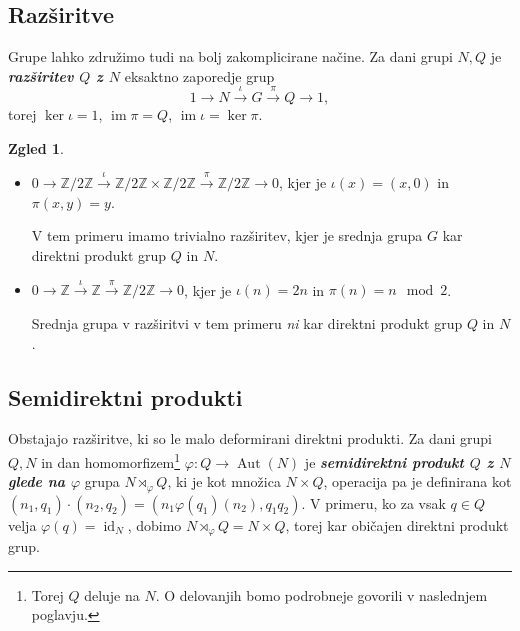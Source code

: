 \documentclass[11pt]{book}
\def\ZZ{\mathbb{Z}}
\DeclareMathOperator\image{im}
\DeclareMathOperator\Aut{Aut}
\DeclareMathOperator\id{id}
\def\definicija{\color{rdeca}\bf\em}
\theoremstyle{definition}
\theoremstyle{zgled}
\newtheorem*{zgled}{Zgled}
\theoremstyle{odprtproblem}
\theoremstyle{domacanaloga}
\theoremstyle{izrek}
\begin{document}
\subsection{Razširitve}

Grupe lahko združimo tudi na bolj zakomplicirane načine. Za dani grupi $N,Q$ je {\definicija razširitev $Q$ z $N$} eksaktno zaporedje grup
\[
1 \to N \xrightarrow{\iota} G \xrightarrow{\pi} Q \to 1,
\]
torej $\ker \iota = 1$, $\image \pi = Q$, $\image \iota = \ker \pi$.

\begin{zgled}
\begin{itemize}
    \item $0 \to \ZZ/2\ZZ \xrightarrow{\iota} \ZZ/2\ZZ \times \ZZ/2\ZZ \xrightarrow{\pi} \ZZ/2\ZZ \to 0$, kjer je $\iota(x) = (x,0)$ in $\pi(x,y) = y$.

    V tem primeru imamo trivialno razširitev, kjer je srednja grupa $G$ kar direktni produkt grup $Q$ in $N$.

    \item $0 \to \ZZ  \xrightarrow{\iota} \ZZ \xrightarrow{\pi} \ZZ/2\ZZ \to 0$, kjer je $\iota(n) = 2 n$ in $\pi(n) = n \mod{2}$.

    Srednja grupa v razširitvi v tem primeru {\em ni} kar direktni produkt grup $Q$ in $N$.
\end{itemize}
\end{zgled}

\subsection{Semidirektni produkti}

Obstajajo razširitve, ki so le malo deformirani direktni produkti. Za dani grupi $Q,N$ in dan homomorfizem\footnote{Torej $Q$ deluje na $N$. O delovanjih bomo podrobneje govorili v naslednjem poglavju.} $\varphi \colon Q \to \Aut(N)$ je {\definicija semidirektni produkt $Q$ z $N$ glede na $\varphi$} grupa $N \rtimes_\varphi Q$, ki je kot množica $N \times Q$, operacija pa je definirana kot $(n_1, q_1) \cdot (n_2, q_2) = (n_1 \varphi(q_1)(n_2), q_1 q_2)$. V primeru, ko za vsak $q \in Q$ velja $\varphi(q) = \id_N$, dobimo $N \rtimes_\varphi Q = N \times Q$, torej kar običajen direktni produkt grup.
\end{document}
